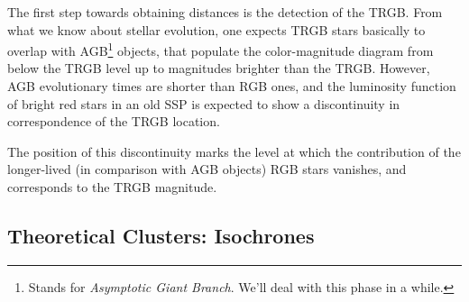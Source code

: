 \par The first step towards obtaining distances is the detection of the TRGB. From what we know about stellar evolution, one expects TRGB stars basically to overlap with AGB\footnote{Stands for \emph{Asymptotic Giant Branch}. We'll deal with this phase in a while.} objects, that populate the color-magnitude diagram from below the TRGB level up to magnitudes brighter than the TRGB. However, AGB evolutionary times are shorter than RGB ones, and the luminosity function of bright red stars in an old SSP is expected to show a discontinuity in correspondence of the TRGB location.
\par The position of this discontinuity marks the level at which the contribution of the longer-lived (in comparison with AGB objects) RGB stars vanishes, and corresponds to the TRGB magnitude.

\subsection{Theoretical Clusters: Isochrones}

